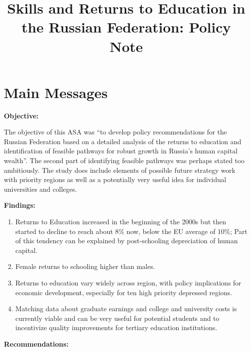 \documentclass[alpha-refs]{wiley-article-04t}
\title{Skills and Returns to Education in the Russian Federation: Policy Note}
\author[]{}
\begin{document}
\maketitle
\vspace{-2.5cm}


\section{Main Messages}

\vspace{-0.5em}

\begin{mdframed}[hidealllines=true,backgroundcolor=blue!20]

	
\textbf{Objective:} 

The objective of this ASA was ``to develop policy recommendations for the 
Russian Federation based on a detailed analysis of the returns to education 
and identification of feasible pathways for robust growth in Russia's human 
capital wealth''. The second part of identifying feasible pathways was 
perhaps stated too ambitiously. The study does include elements of possible 
future strategy work with priority regions as well as a potentially very 
useful idea for individual universities and colleges. 
\vspace{0.5em}


\hspace{-1.8em}  \textbf{Findings:} 
\begin{enumerate}
\item Returns to Education increased in the beginning of the 2000s but then 
started to decline to reach about 8\% now, below the EU average of 10\%; 
Part of this tendency can be explained by post-schooling depreciation of 
human capital.

\item Female returns to schooling higher than males.

\item Returns to education vary widely across region, with policy	
implications for economic development, especially for ten high priority 
depressed regions.

\item Matching data about graduate earnings and college and university 
costs is currently viable and can be very useful for potential students and 
to incentivize quality improvements for tertiary education institutions.
\end{enumerate} 

\hspace{-2.8em}  \textbf{Recommendations:} 
\begin{enumerate}


\end{enumerate}
\end{mdframed}
\end{document}
